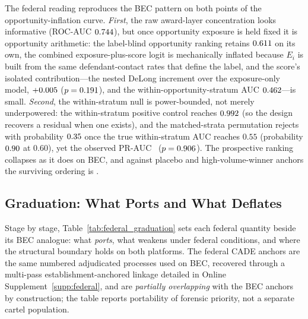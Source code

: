 The federal reading reproduces the BEC pattern on both points of the
opportunity-inflation curve. \emph{First}, the raw award-layer
concentration looks informative (ROC-AUC $0.744$), but once
opportunity exposure is held fixed it is opportunity arithmetic: the
label-blind opportunity ranking retains $0.611$ on its
own, the combined exposure-plus-score logit is mechanically inflated
because $E_i$ is built from the same defendant-contact rates that define
the label, and the score's isolated contribution---the nested DeLong
increment over the exposure-only model, $+0.005$
($p=0.191$), and the within-opportunity-stratum AUC
$0.462$---is small. \emph{Second}, the within-stratum null is
power-bounded, not merely underpowered: the within-stratum positive control
reaches $0.992$ (so the design recovers a residual when
one exists), and the matched-strata permutation rejects with probability
$0.35$ once the true within-stratum AUC reaches $0.55$
(probability $0.90$ at $0.60$), yet the observed PR-AUC
\valFedAudPermVerdict\ ($p=0.906$). The prospective ranking
collapses as it does on BEC, and against placebo and high-volume-winner
anchors the surviving ordering is \valFedAudNegControlVerdict.

\subsection{Graduation: What Ports and What Deflates}
\label{app:federal_graduation}

Stage by stage, Table~\ref{tab:federal_graduation} sets each federal
quantity beside its BEC analogue: what \emph{ports}, what weakens under
federal conditions, and where the structural boundary holds on both
platforms. The federal CADE anchors are the same numbered adjudicated
processes used on BEC, recovered through a multi-pass
establishment-anchored linkage detailed in Online
Supplement~\ref{supp:federal}, and are \emph{partially overlapping} with
the BEC anchors by construction; the table reports portability of forensic
priority, not a separate cartel population.

